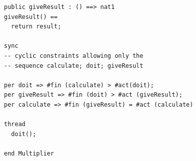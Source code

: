 \documentclass{overturerepchap}
\newcommand{\keyw}[1]{{\bf\ttfamily #1}}
\begin{document}
\begin{description}
\begin{lstlisting}
public giveResult : () ==> nat1
giveResult() ==  
  return result;

sync
-- cyclic constraints allowing only the 
-- sequence calculate; doit; giveResult

per doit => #fin (calculate) > #act(doit);
per giveResult => #fin (doit) > #act (giveResult);
per calculate => #fin (giveResult) = #act (calculate)

thread
  doit();

end Multiplier
\end{lstlisting}

        

%

\end{description}
\end{document}
